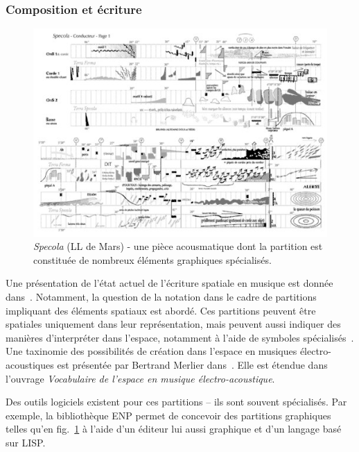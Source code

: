 \documentclass[french,12pt]{article}
\begin{document}
\subsubsection{Composition et écriture}
\begin{figure}[h]
    \centering
    \includegraphics[scale=0.5]{images/specola.jpg}
    \caption{\textit{Specola} (LL de Mars) - une pièce acousmatique dont la partition est constituée de nombreux éléments graphiques spécialisés.}
    \label{fig.specola}
\end{figure}

Une présentation de l'état actuel de l'écriture spatiale en musique est donnée dans~\cite{fober_les_2015}. Notamment, la question de la notation dans le cadre de partitions impliquant des éléments spatiaux est abordé. %
Ces partitions peuvent être spatiales uniquement dans leur représentation, mais peuvent aussi indiquer des manières d'interpréter dans l'espace, notamment à l'aide de symboles spécialisés~\cite{ellberger_spatialization_2014}. Une taxinomie des possibilités de création dans l'espace en musiques électro-acoustiques est présentée par Bertrand Merlier dans~\cite{merlier_vocabulaire_2006}. Elle est étendue dans l'ouvrage \textit{Vocabulaire de l'espace en musique électro-acoustique\cite{merlier_vocabulaire_2006_book}}.

Des outils logiciels existent pour ces partitions -- ils sont souvent spécialisés. Par exemple, la bibliothèque \ac{ENP}\cite{kuuskankare_expressive_2006} permet de concevoir des partitions graphiques telles qu'en fig.~\ref{fig.specola} à l'aide d'un éditeur lui aussi graphique et d'un langage basé sur LISP.
\end{document}
